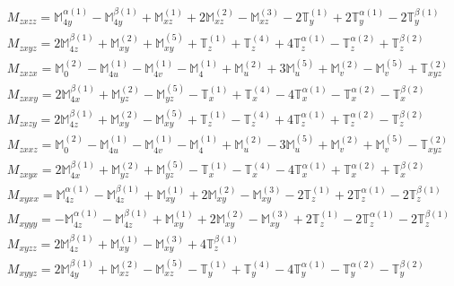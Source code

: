 \documentclass[fleqn,8pt,landscape]{jsarticle}
\begin{document}
\begin{align*}
& M_{zxzz} = \mathbb{M}_{4y}^{\alpha(1)} - \mathbb{M}_{4y}^{\beta(1)} + \mathbb{M}_{xz}^{(1)} + 2 \mathbb{M}_{xz}^{(2)} - \mathbb{M}_{xz}^{(3)} - 2 \mathbb{T}_{y}^{(1)} + 2 \mathbb{T}_{y}^{\alpha(1)} - 2 \mathbb{T}_{y}^{\beta(1)} \\
& M_{zxyz} = 2 \mathbb{M}_{4z}^{\beta(1)} + \mathbb{M}_{xy}^{(2)} + \mathbb{M}_{xy}^{(5)} + \mathbb{T}_{z}^{(1)} + \mathbb{T}_{z}^{(4)} + 4 \mathbb{T}_{z}^{\alpha(1)} - \mathbb{T}_{z}^{\alpha(2)} + \mathbb{T}_{z}^{\beta(2)} \\
& M_{zxzx} = \mathbb{M}_{0}^{(2)} - \mathbb{M}_{4u}^{(1)} - \mathbb{M}_{4v}^{(1)} - \mathbb{M}_{4}^{(1)} + \mathbb{M}_{u}^{(2)} + 3 \mathbb{M}_{u}^{(5)} + \mathbb{M}_{v}^{(2)} - \mathbb{M}_{v}^{(5)} + \mathbb{T}_{xyz}^{(2)} \\
& M_{zxxy} = 2 \mathbb{M}_{4x}^{\beta(1)} + \mathbb{M}_{yz}^{(2)} - \mathbb{M}_{yz}^{(5)} - \mathbb{T}_{x}^{(1)} + \mathbb{T}_{x}^{(4)} - 4 \mathbb{T}_{x}^{\alpha(1)} - \mathbb{T}_{x}^{\alpha(2)} - \mathbb{T}_{x}^{\beta(2)} \\
& M_{zxzy} = 2 \mathbb{M}_{4z}^{\beta(1)} + \mathbb{M}_{xy}^{(2)} - \mathbb{M}_{xy}^{(5)} + \mathbb{T}_{z}^{(1)} - \mathbb{T}_{z}^{(4)} + 4 \mathbb{T}_{z}^{\alpha(1)} + \mathbb{T}_{z}^{\alpha(2)} - \mathbb{T}_{z}^{\beta(2)} \\
& M_{zxxz} = \mathbb{M}_{0}^{(2)} - \mathbb{M}_{4u}^{(1)} - \mathbb{M}_{4v}^{(1)} - \mathbb{M}_{4}^{(1)} + \mathbb{M}_{u}^{(2)} - 3 \mathbb{M}_{u}^{(5)} + \mathbb{M}_{v}^{(2)} + \mathbb{M}_{v}^{(5)} - \mathbb{T}_{xyz}^{(2)} \\
& M_{zxyx} = 2 \mathbb{M}_{4x}^{\beta(1)} + \mathbb{M}_{yz}^{(2)} + \mathbb{M}_{yz}^{(5)} - \mathbb{T}_{x}^{(1)} - \mathbb{T}_{x}^{(4)} - 4 \mathbb{T}_{x}^{\alpha(1)} + \mathbb{T}_{x}^{\alpha(2)} + \mathbb{T}_{x}^{\beta(2)} \\
& M_{xyxx} = \mathbb{M}_{4z}^{\alpha(1)} - \mathbb{M}_{4z}^{\beta(1)} + \mathbb{M}_{xy}^{(1)} + 2 \mathbb{M}_{xy}^{(2)} - \mathbb{M}_{xy}^{(3)} - 2 \mathbb{T}_{z}^{(1)} + 2 \mathbb{T}_{z}^{\alpha(1)} - 2 \mathbb{T}_{z}^{\beta(1)} \\
& M_{xyyy} = - \mathbb{M}_{4z}^{\alpha(1)} - \mathbb{M}_{4z}^{\beta(1)} + \mathbb{M}_{xy}^{(1)} + 2 \mathbb{M}_{xy}^{(2)} - \mathbb{M}_{xy}^{(3)} + 2 \mathbb{T}_{z}^{(1)} - 2 \mathbb{T}_{z}^{\alpha(1)} - 2 \mathbb{T}_{z}^{\beta(1)} \\
& M_{xyzz} = 2 \mathbb{M}_{4z}^{\beta(1)} + \mathbb{M}_{xy}^{(1)} - \mathbb{M}_{xy}^{(3)} + 4 \mathbb{T}_{z}^{\beta(1)} \\
& M_{xyyz} = 2 \mathbb{M}_{4y}^{\beta(1)} + \mathbb{M}_{xz}^{(2)} - \mathbb{M}_{xz}^{(5)} - \mathbb{T}_{y}^{(1)} + \mathbb{T}_{y}^{(4)} - 4 \mathbb{T}_{y}^{\alpha(1)} - \mathbb{T}_{y}^{\alpha(2)} - \mathbb{T}_{y}^{\beta(2)} \\

\end{align*}
\end{document}

